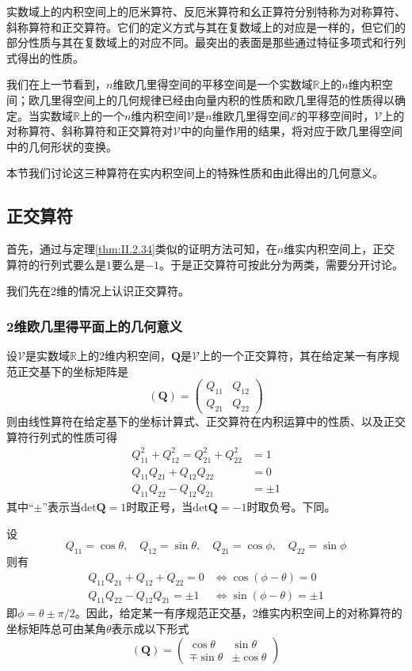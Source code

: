 \documentclass[main.tex]{subfiles}
\begin{document}
实数域上的内积空间上的厄米算符、反厄米算符和幺正算符分别特称为对称算符、斜称算符和正交算符。它们的定义方式与其在复数域上的对应是一样的，但它们的部分性质与其在复数域上的对应不同。最突出的表面是那些通过特征多项式和行列式得出的性质。

我们在上一节看到，$n$维欧几里得空间的平移空间是一个实数域$\mathbb{R}$上的$n$维内积空间；欧几里得空间上的几何规律已经由向量内积的性质和欧几里得范的性质得以确定。当实数域$\mathbb{R}$上的一个$n$维内积空间$\mathcal{V}$是$n$维欧几里得空间$\mathcal{E}$的平移空间时，$\mathcal{V}$上的对称算符、斜称算符和正交算符对$\mathcal{V}$中的向量作用的结果，将对应于欧几里得空间中的几何形状的变换。

本节我们讨论这三种算符在实内积空间上的特殊性质和由此得出的几何意义。

\subsection{正交算符}
首先，通过与定理\ref{thm:II.2.34}类似的证明方法可知，在$n$维实内积空间上，正交算符的行列式要么是$1$要么是$-1$。于是正交算符可按此分为两类，需要分开讨论。

我们先在2维的情况上认识正交算符。

\subsubsection{2维欧几里得平面上的几何意义}
设$\mathcal{V}$是实数域$\mathbb{R}$上的2维内积空间，$\mathbf{Q}$是$\mathcal{V}$上的一个正交算符，其在给定某一有序规范正交基下的坐标矩阵是
\[\left(\mathbf{Q}\right)=\left(\begin{array}{cc}Q_{11}&Q_{12}\\Q_{21}&Q_{22}\end{array}\right)\]
则由线性算符在给定基下的坐标计算式、正交算符在内积运算中的性质、以及正交算符行列式的性质可得
\begin{align*}
    Q_{11}^2+Q_{12}^2=Q_{21}^2+Q_{22}^2 & =1     \\
    Q_{11}Q_{21}+Q_{12}Q_{22}           & =0     \\
    Q_{11}Q_{22}-Q_{12}Q_{21}           & =\pm 1
\end{align*}
其中“$\pm$”表示当$\mathrm{det}\mathbf{Q}=1$时取正号，当$\mathrm{det}\mathbf{Q}=-1$时取负号。下同。

设
\[Q_{11}=\cos\theta,\quad Q_{12}=\sin\theta,\quad Q_{21}=\cos\phi,\quad Q_{22}=\sin\phi\]
则有
\begin{align*}
    Q_{11}Q_{21}+Q_{12}+Q_{22}  =0    & \Leftrightarrow\cos\left(\phi-\theta\right)=0     \\
    Q_{11}Q_{22}-Q_{12}Q_{21}  =\pm 1 & \Leftrightarrow\sin\left(\phi-\theta\right)=\pm 1
\end{align*}
即$\phi=\theta\pm\pi/2$。因此，给定某一有序规范正交基，2维实内积空间上的对称算符的坐标矩阵总可由某角$\theta$表示成以下形式
\[\left(\mathbf{Q}\right)=\left(\begin{array}{cc}\cos\theta&\sin\theta\\\mp\sin\theta&\pm\cos\theta\end{array}\right)\]
\end{document}
